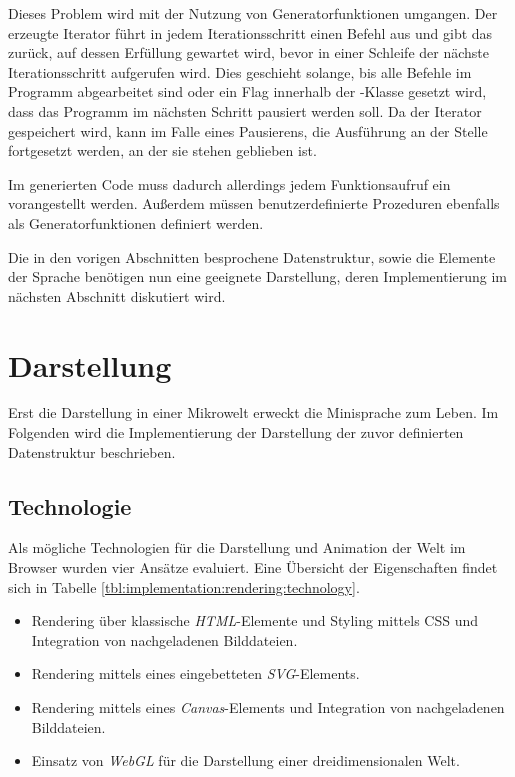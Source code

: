 Dieses Problem wird mit der Nutzung von Generatorfunktionen umgangen. Der erzeugte Iterator führt in jedem Iterationsschritt einen Befehl aus und gibt das  zurück, auf dessen Erfüllung gewartet wird, bevor in einer Schleife der nächste Iterationsschritt aufgerufen wird. Dies geschieht solange, bis alle Befehle im Programm abgearbeitet sind oder ein Flag innerhalb der -Klasse gesetzt wird, dass das Programm im nächsten Schritt pausiert werden soll. Da der Iterator gespeichert wird, kann im Falle eines Pausierens, die Ausführung an der Stelle fortgesetzt werden, an der sie stehen geblieben ist.

Im generierten Code muss dadurch allerdings jedem Funktionsaufruf ein  vorangestellt werden. Außerdem müssen benutzerdefinierte Prozeduren ebenfalls als Generatorfunktionen definiert werden.

Die in den vorigen Abschnitten besprochene Datenstruktur, sowie die Elemente der Sprache benötigen nun eine geeignete Darstellung, deren Implementierung im nächsten Abschnitt diskutiert wird.

\section{Darstellung}
\label{sec:implementation:rendering}

Erst die Darstellung in einer Mikrowelt erweckt die Minisprache zum Leben. Im Folgenden wird die Implementierung der Darstellung der zuvor definierten Datenstruktur beschrieben.

\subsection{Technologie}
\label{sec:implementation:rendering:technology}

Als mögliche Technologien für die Darstellung und Animation der Welt im Browser wurden vier Ansätze evaluiert. Eine Übersicht der Eigenschaften findet sich in Tabelle \ref{tbl:implementation:rendering:technology}.

\begin{itemize}[noitemsep]
  \item Rendering über klassische \emph{HTML}-Elemente und Styling mittels CSS und Integration von nachgeladenen Bilddateien.
  \item Rendering mittels eines eingebetteten \emph{SVG}-Elements.
  \item Rendering mittels eines \emph{Canvas}-Elements und Integration von nachgeladenen Bilddateien.
  \item Einsatz von \emph{WebGL} für die Darstellung einer dreidimensionalen Welt.
\end{itemize}


